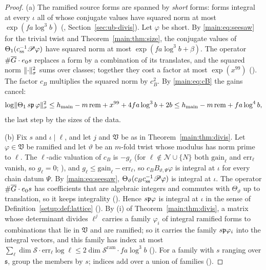 \begin{proof}
(a) The ramified source forms are spanned by \emph{short} forms: forms integral at every $\iota$
all of whose conjugate values have squared norm at most $\exp(f a\log^3 b)$
(, Section~\ref{sec:ub-divis}). Let
$\varphi$ be short. By \eqref{main:eq:seesaw} for the trivial twist and
Theorem~\ref{main:thm:size}, the conjugate values of
$\Theta_1(c_{\mathrm{ss}}^{-1}\mathscr{P}\varphi)$ have squared norm at most
$\exp(f a\log^3 b + \beta)$. The operator $\#\overline{G}\cdot e_0 s$ replaces a form by a combination of
its translates, and the squared norm $\lVert\cdot\rVert_\sigma^2$ sums over classes; together they cost
a factor at most $\exp(x^{99})$ (). The factor $c_B$
multiplies the squared norm by $c_B^2$. By \eqref{main:eq:cB} the gains cancel:
\[
  \log\lVert\Theta_1\,s\mathfrak{p}\,\varphi\rVert_\sigma^2
  \le h_{\mathrm{main}} - m\,\mathrm{rem} + x^{99} + 4 f a\log^3 b + 2b
  \le h_{\mathrm{main}} - m\,\mathrm{rem} + f a\log^4 b ,
\]
the last step by the sizes of the data.

(b) Fix $s$ and $\iota \mid \ell$, and let $j$ and $\mathfrak V$ be as in Theorem~\ref{main:thm:divis}. Let
$\varphi \in\mathfrak V$ be ramified and let $\vartheta$ be an $m$-fold twist whose modulus has norm prime
to $\ell$. The $\ell$-adic valuation of $c_B$ is $-g_\ell$ (for $\ell \notin \mathcal{N}\cup\{N\}$
both $\mathrm{gain}_\ell$ and $\mathrm{err}_\ell$ vanish, so $g_\ell = 0$;
), and $g_\ell \le \mathrm{gain}_\ell - \mathrm{err}_\ell$, so
$c_B B_{\vartheta,\Psi}\varphi$ is integral at $\iota$ for every chain datum $\Psi$. By
\eqref{main:eq:seesaw}, $\Theta_\vartheta(c_B c_{\mathrm{ss}}^{-1}\mathscr{P}\varphi)$ is integral at $\iota$. The operator $\#\overline{G}\cdot e_0 s$ has coefficients that are algebraic
integers and commutes with $\Theta_\vartheta$ up to translation, so it keeps integrality
(). Hence $s\mathfrak{p}\varphi$ is integral at
$\iota$ in the sense of Definition~\ref{setup:def:lattice}
(). By (i) of
Theorem~\ref{main:thm:divis}, a matrix whose determinant divides $\ell^j$ carries a family
$\varphi_i$ of integral ramified forms to combinations that lie in $\mathfrak V$ and are ramified; so it
carries the family $s\mathfrak{p}\varphi_i$ into the integral vectors, and this family has index at
most $\sum_\ell \dim\mathcal{S}\cdot\mathrm{err}_\ell\log\ell \le
2\dim\mathcal{S}^{\mathrm{ram}}\cdot f a\log^3 b$
(). For a family with $s$ ranging over $\mathfrak{s}$,
group the members by $s$; indices add over a union of families
().
\end{proof}

